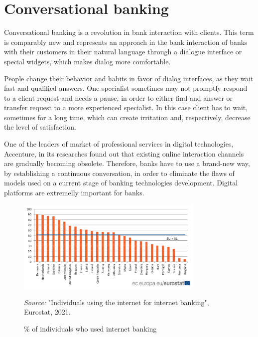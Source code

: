 
\section{Conversational banking}

Conversational banking is a revolution in bank interaction with clients.
This term is comparably new and represents an approach in the bank interaction of banks with their customers in their natural language through a dialogue interface or special widgets, which makes dialog more comfortable.

People change their behavior and habits in favor of dialog interfaces, as they wait fast and qualified answers.
One specialist sometimes may not promptly respond to a client request and needs a pause, in order to either find and answer or transfer request to a more experienced specialist.
In this case client has to wait, sometimes for a long time, which can create irritation and, respectively, decrease the level of satisfaction.

One of the leaders of market of professional services in digital technologies, Accenture, in its researches found out that existing online interaction channels are gradually becoming obsolete.
Therefore, banks have to use a brand-new way, by establishing a continuous conversation, in order to eliminate the flaws of models used on a current stage of banking technologies development.
Digital platforms are extremelly important for banks.
\cite{accenture_conversational_banking}

\begin{figure}
    \centering
    \includegraphics[width=0.8\textwidth,height=\textheight,keepaspectratio]{images/share_internet_banking.png}
    \caption{\% of individuals who used internet banking}
    \medskip
    \footnotesize\textit{Source:} "Individuals using the internet for internet banking", Eurostat, 2021.
\end{figure}

